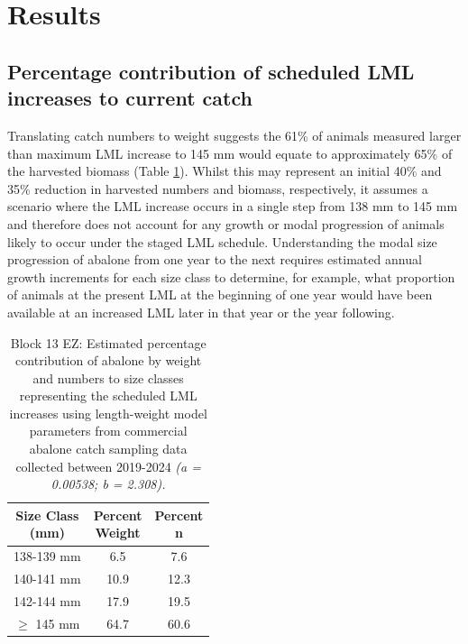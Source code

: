 \documentclass[
]{article}
\begin{document}
\section{Results}\label{results}

\subsection{Percentage contribution of scheduled LML increases to current catch}\label{percentage-contribution-of-scheduled-lml-increases-to-current-catch}

Translating catch numbers to weight suggests the 61\% of animals measured larger than maximum LML increase to 145 mm would equate to approximately 65\% of the harvested biomass (Table \ref{tab:lmlsumtab}). Whilst this may represent an initial 40\% and 35\% reduction in harvested numbers and biomass, respectively, it assumes a scenario where the LML increase occurs in a single step from 138 mm to 145 mm and therefore does not account for any growth or modal progression of animals likely to occur under the staged LML schedule. Understanding the modal size progression of abalone from one year to the next requires estimated annual growth increments for each size class to determine, for example, what proportion of animals at the present LML at the beginning of one year would have been available at an increased LML later in that year or the year following.

\begin{table}[!h]
\centering
\caption{\label{tab:lmlsumtab}Block 13 EZ: Estimated percentage contribution of abalone by weight and numbers to size classes representing the scheduled LML increases using length-weight model parameters from commercial abalone catch sampling data collected between 2019-2024\textit{ (a = 0.00538; b = 2.308).}}
\centering
\begin{tabular}[t]{ccc}
\toprule
\makecell[c]{Size Class\\(mm)} & \makecell[c]{Percent\\Weight} & \makecell[c]{Percent\\n}\\
\midrule
138-139 mm & 6.5 & 7.6\\
140-141 mm & 10.9 & 12.3\\
142-144 mm & 17.9 & 19.5\\
$\geq$ 145 mm & 64.7 & 60.6\\
\bottomrule
\end{tabular}
\end{table}
\end{document}
